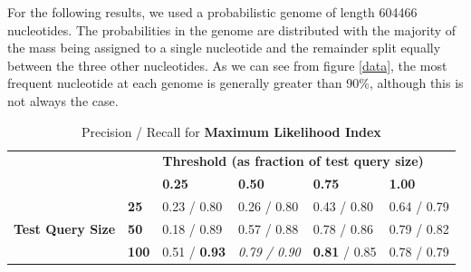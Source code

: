 \documentclass[11pt]{IEEEtran}
\begin{document}
For the following results, we used a probabilistic genome of length 604466 nucleotides. The probabilities in the genome are distributed with the majority of the mass being assigned to a single nucleotide and the remainder split equally between the three other nucleotides. As we can see from figure \ref{data}, the most frequent nucleotide at each genome is generally greater than 90\%, although this is not always the case.

\begin{table}[]
\centering
\caption{Precision / Recall for \textbf{Maximum Likelihood Index}}
\label{ml}
\begin{tabular}{ll|llll}
\cline{3-6}
                                                       &              & \multicolumn{4}{l|}{\textbf{Threshold (as fraction of test query size)}}                                                                          \\ \cline{3-6} 
\textbf{}                                              &              & \multicolumn{1}{l|}{\textbf{0.25}} & \multicolumn{1}{l|}{\textbf{0.50}} & \multicolumn{1}{l|}{\textbf{0.75}} & \multicolumn{1}{l|}{\textbf{1.00}} \\ \hline
\multicolumn{1}{|l|}{\multirow{3}{*}{\textbf{Test Query Size}}} & \textbf{25}  & 0.23 / 0.80                         & 0.26 / 0.80                         & 0.43 / 0.80                        & 0.64 / 0.79                        \\ \cline{2-2}
\multicolumn{1}{|l|}{}                                 & \textbf{50}  & 0.18 / 0.89                        & 0.57 / 0.88                         & 0.78 / 0.86                         & 0.79 / 0.82                        \\ \cline{2-2}
\multicolumn{1}{|l|}{}                                 & \textbf{100} & 0.51 / \textbf{0.93}                          & \emph{0.79 / 0.90}                      & \textbf{0.81} / 0.85                         & 0.78 / 0.79                          \\ \cline{1-2}
\end{tabular}
\end{table}
\end{document}
